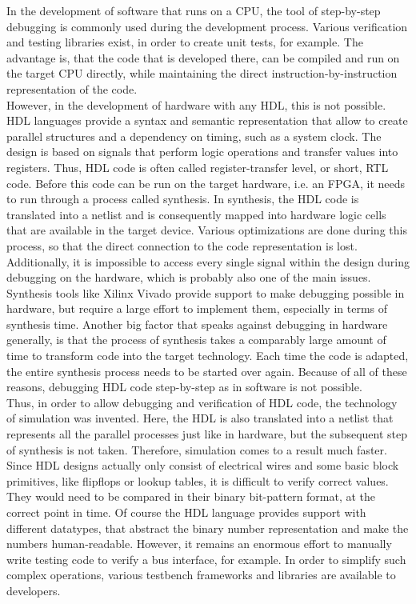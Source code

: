 In the development of software that runs on a CPU, the tool of step-by-step debugging is commonly used during the development process.
Various verification and testing libraries exist, in order to create unit tests, for example.
The advantage is, that the code that is developed there, can be compiled and run on the target CPU directly, while maintaining the direct instruction-by-instruction representation of the code.\\

However, in the development of hardware with any HDL, this is not possible.
HDL languages provide a syntax and semantic representation that allow to create parallel structures and a dependency on timing, such as a system clock.
The design is based on signals that perform logic operations and transfer values into registers.
Thus, HDL code is often called register-transfer level, or short, RTL code.
Before this code can be run on the target hardware, i.e. an FPGA, it needs to run through a process called synthesis.
In synthesis, the HDL code is translated into a netlist and is consequently mapped into hardware logic cells that are available in the target device.
Various optimizations are done during this process, so that the direct connection to the code representation is lost.
Additionally, it is impossible to access every single signal within the design during debugging on the hardware, which is probably also one of the main issues.
Synthesis tools like Xilinx Vivado provide support to make debugging possible in hardware, but require a large effort to implement them, especially in terms of synthesis time.
Another big factor that speaks against debugging in hardware generally, is that the process of synthesis takes a comparably large amount of time to transform code into the target technology.
Each time the code is adapted, the entire synthesis process needs to be started over again.
Because of all of these reasons, debugging HDL code step-by-step as in software is not possible.\\

Thus, in order to allow debugging and verification of HDL code, the technology of simulation was invented.
Here, the HDL is also translated into a netlist that represents all the parallel processes just like in hardware, but the subsequent step of synthesis is not taken.
Therefore, simulation comes to a result much faster.
Since HDL designs actually only consist of electrical wires and some basic block primitives, like flipflops or lookup tables, it is difficult to verify correct values.
They would need to be compared in their binary bit-pattern format, at the correct point in time.
Of course the HDL language provides support with different datatypes, that abstract the binary number representation and make the numbers human-readable.
However, it remains an enormous effort to manually write testing code to verify a bus interface, for example.
In order to simplify such complex operations, various testbench frameworks and libraries are available to developers.

